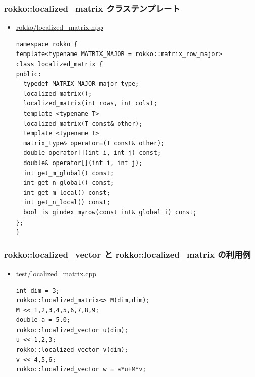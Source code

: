 \begin{frame}[c,fragile]
  \frametitle{rokko::localized\_matrix クラステンプレート}
  \begin{itemize}
  \item \href{https://github.com/t-sakashita/rokko/blob/master/rokko/localized_matrix.hpp}{rokko/localized\_matrix.hpp}
\begin{lstlisting}
namespace rokko {
template<typename MATRIX_MAJOR = rokko::matrix_row_major>
class localized_matrix {
public:
  typedef MATRIX_MAJOR major_type;
  localized_matrix();
  localized_matrix(int rows, int cols);
  template <typename T>
  localized_matrix(T const& other);
  template <typename T>
  matrix_type& operator=(T const& other);
  double operator[](int i, int j) const;
  double& operator[](int i, int j);
  int get_m_global() const;
  int get_n_global() const;
  int get_m_local() const;
  int get_n_local() const;
  bool is_gindex_myrow(const int& global_i) const;
};
}
\end{lstlisting}
  \end{itemize}
\end{frame}

\begin{frame}[c,fragile]
  \frametitle{rokko::localized\_vector と rokko::localized\_matrix の利用例}
  \begin{itemize}
  \item \href{https://github.com/t-sakashita/rokko/blob/master/test/localized_matrix.cpp}{test/localized\_matrix.cpp}
\begin{lstlisting}
int dim = 3;
rokko::localized_matrix<> M(dim,dim);
M << 1,2,3,4,5,6,7,8,9;
double a = 5.0;
rokko::localized_vector u(dim);
u << 1,2,3;
rokko::localized_vector v(dim);
v << 4,5,6;
rokko::localized_vector w = a*u+M*v;
\end{lstlisting}
  \end{itemize}
\end{frame}

